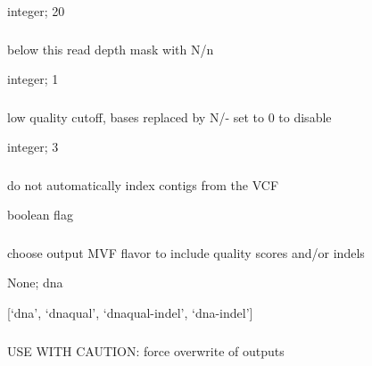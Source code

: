 \documentclass[letterpaper,11pt,english]{sphinxmanual}
\begin{document}
 integer;  20


\subsubsection{}
\label{\detokenize{prog_desc:mask-depth-maskdepth}}
 below this read depth mask with N/n

 integer;  1


\subsubsection{}
\label{\detokenize{prog_desc:mask-qual-maskqual}}
 low quality cutoff, bases replaced by N/- set to 0 to disable

 integer;  3


\subsubsection{}
\label{\detokenize{prog_desc:no-autoindex-noautoindex}}
 do not automatically index contigs from the VCF

 boolean flag


\subsubsection{}
\label{\detokenize{prog_desc:out-flavor-outflavor}}
 choose output MVF flavor to include quality scores and/or indels

 None;  dna

 {[}‘dna’, ‘dnaqual’, ‘dnaqual-indel’, ‘dna-indel’{]}


\subsubsection{}
\label{\detokenize{prog_desc:id40}}
 USE WITH CAUTION: force overwrite of outputs
\end{document}
